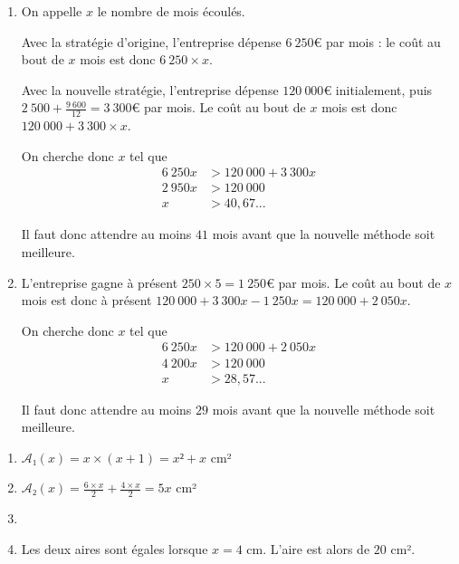 \documentclass[
	classe=1 STI2D,
	gray,
	surFeuille,
	headerTitle=Évaluation\space Chapitre\space 2
]{évaluation}
\begin{document}
\begin{exercice}
	\begin{enumerate}
		\item On appelle $x$ le nombre de mois écoulés.

		      Avec la stratégie d'origine, l'entreprise dépense $6\ 250€$ par mois : le coût au bout de $x$ mois est donc $6\ 250 × x$.

		      Avec la nouvelle stratégie, l'entreprise dépense $120\ 000€$ initialement, puis $2\ 500 + \frac{9\ 600}{12} = 3\ 300€$ par mois. Le coût au bout de $x$ mois est donc $120\ 000 + 3\ 300 × x$.

		      On cherche  donc $x$ tel que
		      \begin{align*}
			      6\ 250x & > 120\ 000 + 3\ 300x \\
			      2\ 950x & > 120\ 000           \\
			      x       & > 40,67...
		      \end{align*}

		      Il faut donc attendre au moins $41$ mois avant que la nouvelle méthode soit meilleure.
		\item L'entreprise gagne à présent $250 × 5 = 1\ 250€$ par mois. Le coût au bout de $x$ mois est donc à présent $120\ 000 + 3\ 300x - 1\ 250x = 120\ 000 + 2\ 050x$.

		      On cherche donc $x$ tel que
		      \begin{align*}
			      6\ 250x & > 120\ 000 + 2\ 050x \\
			      4\ 200x & > 120\ 000           \\
			      x       & > 28,57...
		      \end{align*}

		      Il faut donc attendre au moins $29$ mois avant que la nouvelle méthode soit meilleure.
	\end{enumerate}
\end{exercice}

\begin{exercice}
	\begin{enumerate}
		\item $𝒜₁(x) = x × (x+1) = x² + x$ cm²
		\item $𝒜₂(x) = \frac{6×x}{2} + \frac{4×x}{2} = 5x$ cm²
		\item {}
		\item Les deux aires sont égales lorsque $x = 4$ cm. L'aire est alors de $20$ cm².
	\end{enumerate}
\end{exercice}
\end{document}
